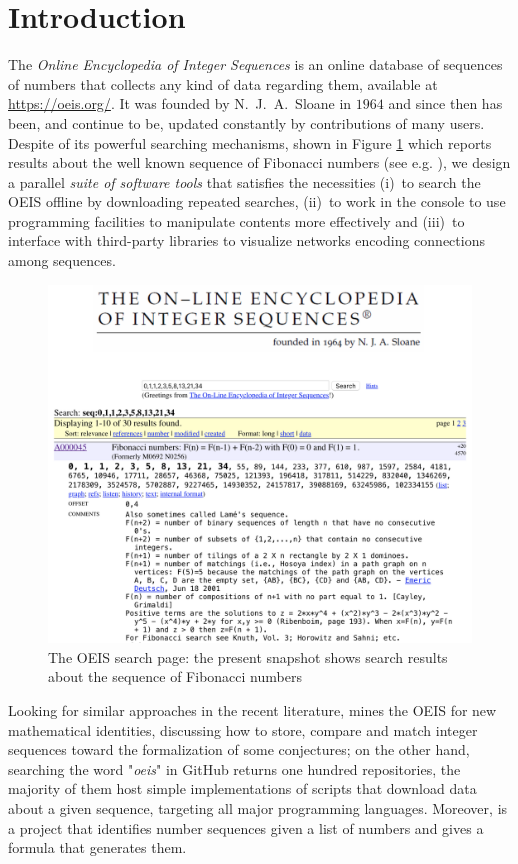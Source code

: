 
\section{Introduction}

The \textit{Online Encyclopedia of Integer Sequences} \citep{OEIS} is an online
database of sequences of numbers that collects any kind of data regarding them,
available at \url{https://oeis.org/}.  It was founded by N.~J.~A.~Sloane in
$1964$ and since then has been, and continue to be, updated constantly by
contributions of many users. Despite of its powerful searching mechanisms,
shown in Figure \ref{fig:oeis:page} which reports results about the well known
sequence of Fibonacci numbers (see e.g.  \citep{ConcreteMath}), we design a
parallel \textit{suite of software tools} that satisfies the necessities (i)~to
search the OEIS offline by downloading repeated searches, (ii)~to work in the
console to use programming facilities to manipulate contents more effectively
and (iii)~to interface with third-party libraries to visualize networks 
encoding connections among sequences.

\begin{figure}
\centering
\includegraphics{OEIS/oeis-page}
\caption{The OEIS search page: the present snapshot shows search
results about the sequence of Fibonacci numbers }
\label{fig:oeis:page}
\end{figure}

Looking for similar approaches in the recent literature,
\citep{Nguyen_miningthe} mines the OEIS for new mathematical identities,
discussing how to store, compare and match integer sequences toward the
formalization of some conjectures; on the other hand, searching the word
"\textit{oeis}" in GitHub returns one hundred repositories, the majority of
them host simple implementations of scripts that download data about a
given sequence, targeting all major programming languages. Moreover,
\citep{weidmann:sequencer} is a project that identifies number sequences given
a list of numbers and gives a formula that generates them.

